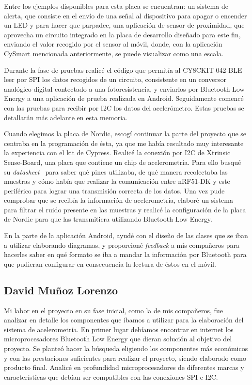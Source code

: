 Entre los ejemplos disponibles para esta placa se encuentran: un sistema de alerta, que consiste en el envío de una señal al dispositivo para apagar o encender un LED y para hacer que parpadee, una aplicación de sensor de proximidad, que aprovecha un circuito integrado en la placa de desarrollo diseñado para este fin, enviando el valor recogido por el sensor al móvil, donde, con la aplicación CySmart mencionada anteriormente, se puede visualizar como una escala.

Durante la fase de pruebas realicé el código que permitía al CY8CKIT-042-BLE leer por SPI los datos recogidos de un circuito, consistente en un conversor analógico-digital contectado a una fotoresistencia, y enviarlos por Bluetooth Low Energy a una aplicación de prueba realizada en Android. Seguidamente comencé con las pruebas para recibir por I2C los datos del acelerómetro. Estas pruebas se detallarán más adelante en esta memoria.

Cuando elegimos la placa de Nordic, escogí continuar la parte del proyecto que se centraba en la programación de ésta, ya que me había resultado muy interesante la experiencia con el kit de Cypress. Realicé la conexión por I2C de Xtrinsic Sense-Board, una placa que contiene un chip de acelerometría. Para ello busqué su \textit{datasheet}~\cite{DatasheetAcc} para saber qué pines utilizaba, de qué manera recolectaba las muestras y cómo había que realizar la comunicación entre nRF51-DK y este periférico para lograr una transmisión correcta de los datos. Una vez pude comprobar que se recibía la información de acelerometría, elaboré un sistema para filtrar el ruido presente en las muestras y realicé la configuración de la placa de Nordic para que las transmitiera utilizando Bluetooth Low Energy.

En la parte de la aplicación Android, ayudé con el diseño de las clases que se iban a utilizar elaborando diagramas, y proporcioné \textit{feedback} a mis compañeros para hacerles saber en qué formato se iba a mandar la información por Bluetooth para que pudieran configurar en consecuencia la lectura de éstos en el móvil.

\subsection{David Muñoz Lorenzo}

Mi labor en el proyecto en su fase inicial, como la de mis compañeros, fue analizar en detalle los componentes que íbamos a utilizar para la elaboración del sistema de acelerometría. En primer lugar debíamos encontrar en internet los microprocesadores Bluetooth Low Energy que dieran solución al objetivo del proyecto.
Se planteó hacer la búsqueda eligiendo los componentes más económicos y con las prestaciones suficientes para realizar el proyecto, siendo elaborado como producto final. Analicé en profundidad microprocesadores de diferentes marcas y características que debían ser compatibles con las conexiones SPI e I2C.

